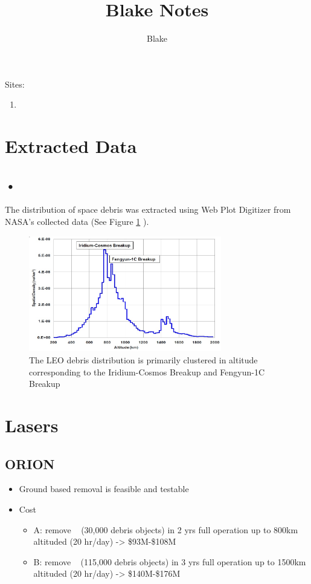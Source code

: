 \documentclass{article}
\title{Blake Notes}
\date{}
\author{Blake}
\begin{document}
\maketitle 


Sites:
\begin{enumerate}
  \item 
\end{enumerate} 



\section{Extracted Data}

\subsection{•}
 
The distribution of space debris was extracted using Web Plot Digitizer \cite{webPlotDigitizer} from NASA's collected data (See Figure \ref{fig:LEO_Debris_Distribution} \cite{NasaLEODensity}).

\begin{figure}[h]
	\centering
    \includegraphics[width=0.75\textwidth]{figures/DebrisDensity.jpg}		
    \caption{The LEO debris distribution is primarily clustered in altitude corresponding to the Iridium-Cosmos Breakup and Fengyun-1C Breakup}
    \label{fig:LEO_Debris_Distribution}
\end{figure}


\section{Lasers}
\subsection{ORION}\cite{ORION}

\begin{itemize}
\item Ground based removal is feasible and testable
\item Cost
\begin{itemize}
\item A: remove ~ (30,000 debris objects) in 2 yrs full operation up to 800km altituded (20 hr/day) -> \$93M-\$108M
\item B: remove ~ (115,000 debris objects) in 3 yrs full operation up to 1500km altituded (20 hr/day) -> \$140M-\$176M
\end{itemize}

\end{itemize}
\end{document}

